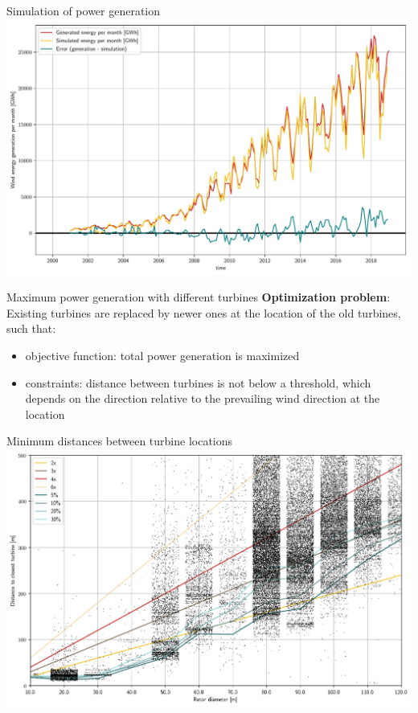 \documentclass[color=usenames,dvipsnames]{beamer}
\begin{document}
    \begin{frame}{Simulation of power generation}
        \includegraphics[width=\textwidth]{../../figures/simulated-energy_time-series.pdf}
    \end{frame}


    \begin{frame}{Maximum power generation with different turbines}
        \textbf{Optimization problem}:\\
        \bigskip
        Existing turbines are replaced by newer ones at the location of the old
        turbines, such that:\\
        \begin{itemize}
            \item objective function: total power generation is maximized
            \item constraints: distance between turbines is not below a threshold\pause ,
                which depends on the direction relative to the prevailing wind direction
                at the location
        \end{itemize}
    \end{frame}

    \begin{frame}{Minimum distances between turbine locations}
        \includegraphics[width=\textwidth]{../../figures/min_distances_between_turbines.png}
    \end{frame}
\end{document}
